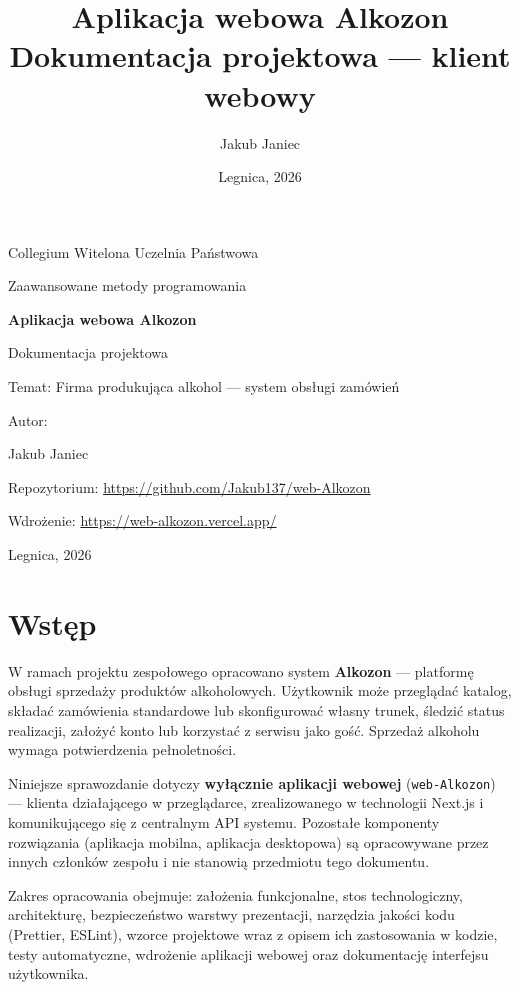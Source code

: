 \documentclass[12pt,a4paper]{report}
\title{%
  \textbf{Aplikacja webowa Alkozon}\\[0.4em]
  \large Dokumentacja projektowa --- klient webowy
}
\author{Jakub Janiec}
\date{Legnica, 2026}
\newcommand{\blok}[1]{\needspace{9\baselineskip}#1}
\begin{document}
\begin{titlepage}
  \thispagestyle{empty}
  \centering
  \vspace*{1cm}
  {\large Collegium Witelona Uczelnia Państwowa\par}
  \vspace{0.5cm}
  {\large Zaawansowane metody programowania\par}
  \vspace{2.5cm}
  {\LARGE\bfseries Aplikacja webowa Alkozon\par}
  \vspace{0.8cm}
  {\large Dokumentacja projektowa\par}
  \vspace{0.5cm}
  {\large Temat: Firma produkująca alkohol --- system obsługi zamówień\par}
  \vfill
  {\large Autor:\par}
  {\large Jakub Janiec\par}
  \vspace{1cm}
  {\normalsize Repozytorium: \url{https://github.com/Jakub137/web-Alkozon}\par}
  \vspace{0.5cm}
  {\normalsize Wdrożenie: \url{https://web-alkozon.vercel.app/}\par}
  \vspace{1.5cm}
  Legnica, 2026
\end{titlepage}

\tableofcontents
\clearpage
{}

\chapter{Wstęp}

\blok{%
W ramach projektu zespołowego opracowano system \textbf{Alkozon} --- platformę obsługi sprzedaży produktów alkoholowych. Użytkownik może przeglądać katalog, składać zamówienia standardowe lub skonfigurować własny trunek, śledzić status realizacji, założyć konto lub korzystać z serwisu jako gość. Sprzedaż alkoholu wymaga potwierdzenia pełnoletności.

Niniejsze sprawozdanie dotyczy \textbf{wyłącznie aplikacji webowej} (\texttt{web-Alkozon}) --- klienta działającego w przeglądarce, zrealizowanego w technologii Next.js i komunikującego się z centralnym API systemu. Pozostałe komponenty rozwiązania (aplikacja mobilna, aplikacja desktopowa) są opracowywane przez innych członków zespołu i nie stanowią przedmiotu tego dokumentu.

Zakres opracowania obejmuje: założenia funkcjonalne, stos technologiczny, architekturę, bezpieczeństwo warstwy prezentacji, narzędzia jakości kodu (Prettier, ESLint), wzorce projektowe wraz z opisem ich zastosowania w kodzie, testy automatyczne, wdrożenie aplikacji webowej oraz dokumentację interfejsu użytkownika.
}
\end{document}
